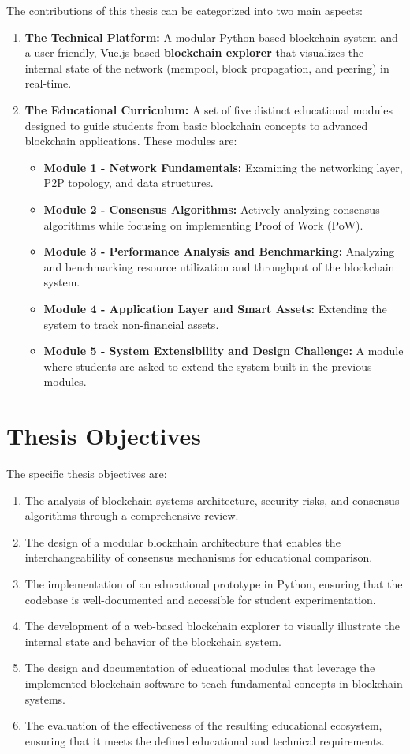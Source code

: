 The contributions of this thesis can be categorized into two main aspects:
\begin{enumerate}
    \item \textbf{The Technical Platform:} A modular Python-based blockchain system and a user-friendly, Vue.js-based \textbf{blockchain explorer} that visualizes the internal state of the network (mempool, block propagation, and peering) in real-time.
    \item \textbf{The Educational Curriculum:} A set of five distinct educational modules designed to guide students from basic blockchain concepts to advanced blockchain applications. These modules are:
    \begin{itemize}
        \item \textbf{Module 1 - Network Fundamentals:} Examining the networking layer, P2P topology, and data structures.
        \item \textbf{Module 2 - Consensus Algorithms:} Actively analyzing consensus algorithms while focusing on implementing Proof of Work (PoW).
        \item \textbf{Module 3 - Performance Analysis and Benchmarking:} Analyzing and benchmarking resource utilization and throughput of the blockchain system.
        \item \textbf{Module 4 - Application Layer and Smart Assets:} Extending the system to track non-financial assets.
        \item \textbf{Module 5 - System Extensibility and Design Challenge:} A module where students are asked to extend the system built in the previous modules.
    \end{itemize}
\end{enumerate}

\section{Thesis Objectives} \label{ch1_objectives}

The specific thesis objectives are:
\begin{enumerate}
    \item The analysis of blockchain systems architecture, security risks, and consensus algorithms through a comprehensive review.
    \item The design of a modular blockchain architecture that enables the interchangeability of consensus mechanisms for educational comparison.
    \item The implementation of an educational prototype in Python, ensuring that the codebase is well-documented and accessible for student experimentation.
    \item The development of a web-based blockchain explorer to visually illustrate the internal state and behavior of the blockchain system.
    \item The design and documentation of educational modules that leverage the implemented blockchain software to teach fundamental concepts in blockchain systems.
    \item The evaluation of the effectiveness of the resulting educational ecosystem, ensuring that it meets the defined educational and technical requirements.
\end{enumerate}